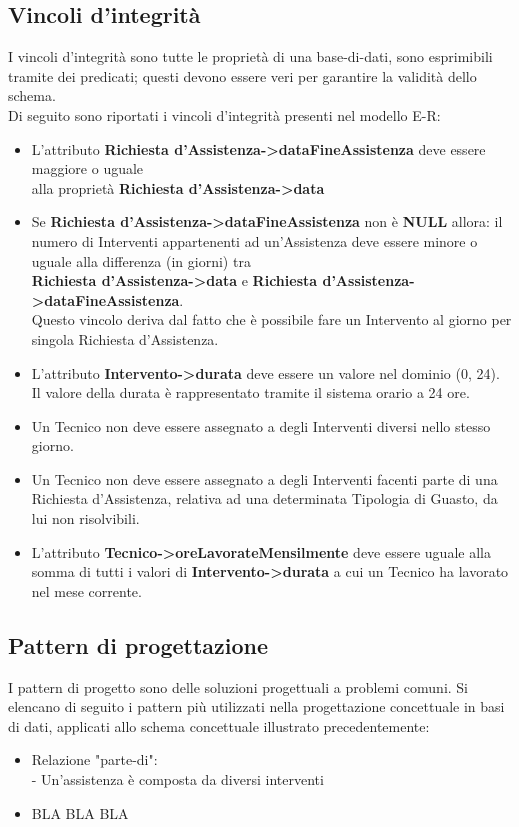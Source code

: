 \documentclass[legalpaper]{article}
\begin{document}
\subsection{Vincoli d'integrità}
I vincoli d'integrità sono tutte le proprietà di una base-di-dati, sono esprimibili 
tramite dei predicati; questi devono essere veri per garantire la validità dello schema.\\
\newline
Di seguito sono riportati i vincoli d'integrità presenti nel modello E-R:
\begin{itemize}
	\item L'attributo  \textbf{Richiesta d'Assistenza->dataFineAssistenza} deve essere maggiore o uguale\\
	alla proprietà \textbf{Richiesta d'Assistenza->data}
	\item Se   \textbf{Richiesta d'Assistenza->dataFineAssistenza} non è \textbf{NULL} allora: il numero di Interventi appartenenti ad un'Assistenza deve essere minore o uguale alla differenza (in giorni) tra \\  \textbf{Richiesta d'Assistenza->data} e   \textbf{Richiesta d'Assistenza->dataFineAssistenza}.\\Questo vincolo deriva dal fatto che è possibile fare un Intervento al giorno per singola Richiesta d'Assistenza.
	\item L'attributo  \textbf{Intervento->durata} deve essere un valore nel dominio (0, 24).
	Il valore della durata è rappresentato tramite il sistema orario a 24 ore.
	\item Un Tecnico non deve essere assegnato a degli Interventi diversi nello stesso giorno.
	\item Un Tecnico non deve essere assegnato a degli Interventi facenti parte di una Richiesta d'Assistenza, relativa ad una determinata Tipologia di Guasto, da lui non risolvibili.
	\item L'attributo  \textbf{Tecnico->oreLavorateMensilmente} deve essere uguale alla somma di tutti i valori di  \textbf{Intervento->durata} a cui un Tecnico ha lavorato nel mese corrente.

	
\end{itemize}

\subsection{Pattern di progettazione}
I pattern di progetto sono delle soluzioni progettuali a problemi comuni. Si elencano di seguito i pattern più utilizzati nella progettazione concettuale in basi di dati, applicati allo schema concettuale illustrato precedentemente:
\begin{itemize}
	\item Relazione "parte-di":\\
	- Un'assistenza è composta da diversi interventi
	
	\item BLA BLA BLA
	

\end{itemize}
	
\end{document}
